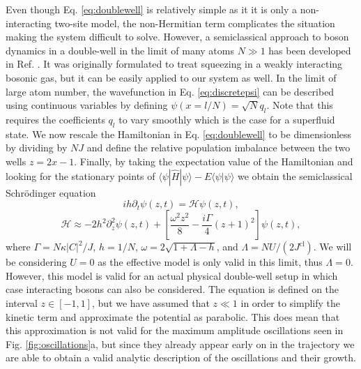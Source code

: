Even though Eq. \eqref{eq:doublewell} is relatively simple as it it is
only a non-interacting two-site model, the non-Hermitian term
complicates the situation making the system difficult to
solve. However, a semiclassical approach to boson dynamics in a
double-well in the limit of many atoms $N \gg 1$ has been developed in
Ref. \cite{juliadiaz2012}. It was originally formulated to treat
squeezing in a weakly interacting bosonic gas, but it can be easily
applied to our system as well. In the limit of large atom number, the
wavefunction in Eq. \eqref{eq:discretepsi} can be described using
continuous variables by defining $\psi (x = l / N) = \sqrt{N}
q_l$. Note that this requires the coefficients $q_l$ to vary smoothly
which is the case for a superfluid state. We now rescale the
Hamiltonian in Eq. \eqref{eq:doublewell} to be dimensionless by
dividing by $NJ$ and define the relative population imbalance between
the two wells $z = 2x - 1$. Finally, by taking the expectation value
of the Hamiltonian and looking for the stationary points of
$\langle \psi | \hat{H} | \psi \rangle - E \langle \psi | \psi
\rangle$ we obtain the semiclassical Schr\"{o}dinger equation
\begin{equation}
  \label{eq:semicl}
  i h \partial_t \psi(z, t) = \mathcal{H} \psi(z, t),
\end{equation}
\begin{equation}
  \label{eq:semiH}
  \mathcal{H} \approx -2 h^2 \partial^2_z \psi(z, t) + \left[
    \frac{\omega^2 z^2} {8} - \frac{i \Gamma} {4} \left( z + 1
    \right)^2 \right] \psi(z, t),
\end{equation}
where $\Gamma = N \kappa |C|^2 / J$, $h = 1/N$,
$\omega = 2 \sqrt{1 + \Lambda - h}$, and
$\Lambda = NU / (2J^\mathrm{cl})$. We will be considering $U = 0$ as
the effective model is only valid in this limit, thus $\Lambda =
0$. However, this model is valid for an actual physical double-well
setup in which case interacting bosons can also be considered. The
equation is defined on the interval $z \in [-1, 1]$, but we have
assumed that $z \ll 1$ in order to simplify the kinetic term and
approximate the potential as parabolic. This does mean that this
approximation is not valid for the maximum amplitude oscillations seen
in Fig. \ref{fig:oscillations}a, but since they already appear early
on in the trajectory we are able to obtain a valid analytic
description of the oscillations and their growth.

